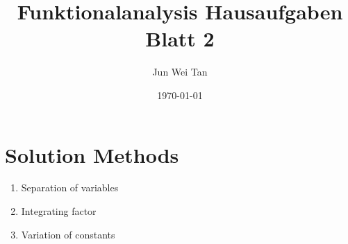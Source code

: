 \documentclass[prb,12pt]{revtex4-2}
\theoremstyle{definition}
\theoremstyle{definition}
\theoremstyle{definition}
\begin{document}
	\title{Funktionalanalysis Hausaufgaben Blatt 2}
	\author{Jun Wei Tan}
	\date{\today}
	\maketitle
	\tableofcontents
	\section{Solution Methods}
	\begin{enumerate}
		\item Separation of variables
		\item Integrating factor
		\item Variation of constants
	\end{enumerate}
\end{document}
